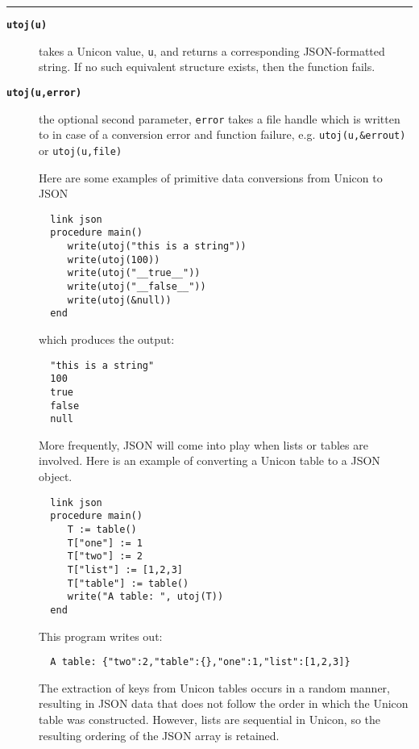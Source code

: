 \documentclass[letterpaper,12pt]{article}
\begin{document}
\noindent\rule{\textwidth}{1pt}
\begin{description}

\item[{\tt\bf utoj(u)}] takes a Unicon value, {\tt u}, and returns a 
  corresponding JSON-formatted string. If no such equivalent structure exists, 
  then the function fails. 

\item[{\tt\bf utoj(u,error)}] the optional second parameter, {\tt error} 
  takes a file handle which is written to in case of a conversion error and
  function failure, e.g. {\tt utoj(u,\&errout)} or {\tt utoj(u,file)}

\vspace{1em}

Here are some examples of primitive data conversions from Unicon to JSON

  \begin{verbatim}
  link json
  procedure main()
     write(utoj("this is a string"))
     write(utoj(100))
     write(utoj("__true__"))
     write(utoj("__false__"))
     write(utoj(&null))
  end
  \end{verbatim}

which produces the output:

  \begin{verbatim}
  "this is a string"
  100
  true
  false
  null 
  \end{verbatim}

More frequently, JSON will come into play when lists or tables are
involved. Here is an example of converting a Unicon table to a JSON object.

  \begin{verbatim}
  link json
  procedure main()
     T := table()
     T["one"] := 1
     T["two"] := 2
     T["list"] := [1,2,3]
     T["table"] := table()
     write("A table: ", utoj(T))
  end
  \end{verbatim}

This program writes out:

  \begin{verbatim}
  A table: {"two":2,"table":{},"one":1,"list":[1,2,3]}
  \end{verbatim}

The extraction of keys from Unicon tables occurs in a random manner,
resulting in JSON data that does not follow the order in which the Unicon
table was constructed. However, lists are sequential in Unicon, so the
resulting ordering of the JSON array is retained. 


\end{description}
\end{document}
